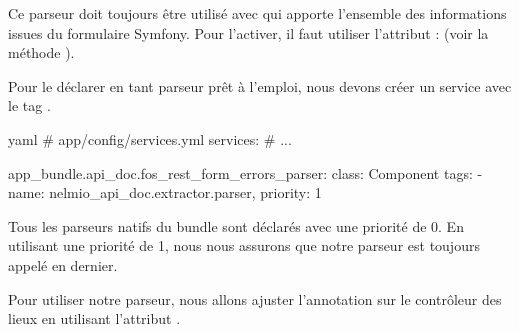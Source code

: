 \documentclass[big]{zmdocument}
\begin{document}
Ce parseur doit toujours être utilisé avec  qui apporte l'ensemble des informations issues du formulaire Symfony. Pour l'activer, il faut utiliser l'attribut :  (voir la méthode ).



Pour le déclarer en tant parseur prêt à l'emploi, nous devons créer un service avec le tag .



\begin{CodeBlock}{yaml}
# app/config/services.yml
services:
    # ...

    app_bundle.api_doc.fos_rest_form_errors_parser:
        class: Component\ApiDoc\Parser\FOSRestFormErrorsParser
        tags:
            - { name: nelmio_api_doc.extractor.parser, priority: 1 }
\end{CodeBlock}



\begin{Information}
Tous les parseurs natifs du bundle sont déclarés avec une priorité de 0. En utilisant une priorité de 1, nous nous assurons que notre parseur est toujours appelé en dernier.
\end{Information}


Pour utiliser notre parseur, nous allons ajuster l'annotation sur le contrôleur des lieux en utilisant l'attribut .



\end{document}
